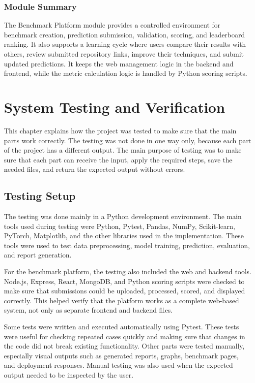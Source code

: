 \documentclass[12pt,a4paper]{report}
\begin{document}
\subsection{Module Summary}
\noindent The Benchmark Platform module provides a controlled environment for
benchmark creation, prediction submission, validation, scoring, and leaderboard
ranking. It also supports a learning cycle where users compare their results
with others, review submitted repository links, improve their techniques, and
submit updated predictions. It keeps the web management logic in the backend and
frontend, while the metric calculation logic is handled by Python scoring
scripts.

\chapter{System Testing and Verification}
This chapter explains how the project was tested to make sure that the main
parts work correctly. The testing was not done in one way only, because each
part of the project has a different output. The main purpose of testing was to make sure that each part can receive the
input, apply the required steps, save the needed files, and return the expected
output without errors.

\section{Testing Setup}

The testing was done mainly in a Python development environment. The main tools
used during testing were Python, Pytest, Pandas, NumPy, Scikit-learn, PyTorch,
Matplotlib, and the other libraries used in the implementation. These tools were
used to test data preprocessing, model training, prediction, evaluation, and
report generation.

For the benchmark platform, the testing also included the web and backend tools.
Node.js, Express, React, MongoDB, and Python scoring scripts were checked to make
sure that submissions could be uploaded, processed, scored, and displayed
correctly. This helped verify that the platform works as a complete web-based
system, not only as separate frontend and backend files.

Some tests were written and executed automatically using Pytest. These tests
were useful for checking repeated cases quickly and making sure that changes in
the code did not break existing functionality. Other parts were tested manually,
especially visual outputs such as generated reports, graphs, benchmark pages,
and deployment responses. Manual testing was also used when the expected output
needed to be inspected by the user.
\end{document}
